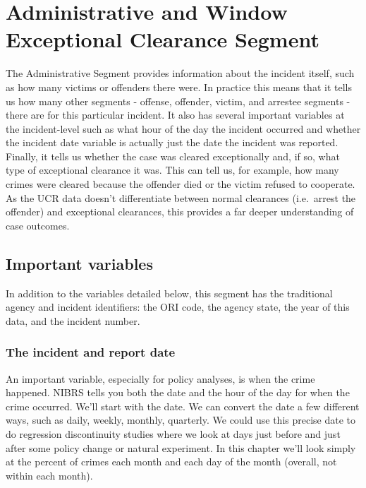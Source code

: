 \documentclass[
  12pt,
  openany]{book}
\begin{document}
\hypertarget{administrative-and-window-exceptional-clearance-segment}{%
\chapter{Administrative and Window Exceptional Clearance Segment}\label{administrative-and-window-exceptional-clearance-segment}}

The Administrative Segment provides information about the incident itself, such as how many victims or offenders there were. In practice this means that it tells us how many other segments - offense, offender, victim, and arrestee segments - there are for this particular incident. It also has several important variables at the incident-level such as what hour of the day the incident occurred and whether the incident date variable is actually just the date the incident was reported. Finally, it tells us whether the case was cleared exceptionally and, if so, what type of exceptional clearance it was. This can tell us, for example, how many crimes were cleared because the offender died or the victim refused to cooperate. As the UCR data doesn't differentiate between normal clearances (i.e.~arrest the offender) and exceptional clearances, this provides a far deeper understanding of case outcomes.

\hypertarget{important-variables}{%
\section{Important variables}\label{important-variables}}

In addition to the variables detailed below, this segment has the traditional agency and incident identifiers: the ORI code, the agency state, the year of this data, and the incident number.

\hypertarget{the-incident-and-report-date}{%
\subsection{The incident and report date}\label{the-incident-and-report-date}}

An important variable, especially for policy analyses, is when the crime happened. NIBRS tells you both the date and the hour of the day for when the crime occurred. We'll start with the date. We can convert the date a few different ways, such as daily, weekly, monthly, quarterly. We could use this precise date to do regression discontinuity studies where we look at days just before and just after some policy change or natural experiment. In this chapter we'll look simply at the percent of crimes each month and each day of the month (overall, not within each month).
\end{document}
